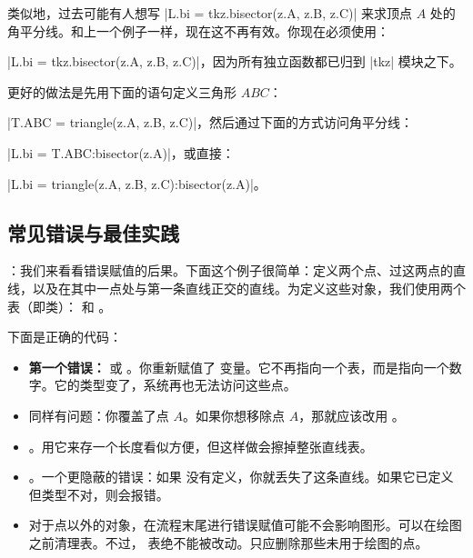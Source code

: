 \vspace{12pt}
类似地，过去可能有人想写 |L.bi = tkz.bisector(z.A, z.B, z.C)| 来求顶点 $A$ 处的角平分线。和上一个例子一样，现在这不再有效。你现在必须使用：

|L.bi = tkz.bisector(z.A, z.B, z.C)|，因为所有独立函数都已归到 |tkz| 模块之下。

更好的做法是先用下面的语句定义三角形 $ABC$：

|T.ABC = triangle(z.A, z.B, z.C)|，然后通过下面的方式访问角平分线：

|L.bi = T.ABC:bisector(z.A)|，或直接：

|L.bi = triangle(z.A, z.B, z.C):bisector(z.A)|。

\subsection{常见错误与最佳实践}

\vspace{1em}
\tkzRHand{\textcolor{red}{第二个警告}}：我们来看看错误赋值的后果。下面这个例子很简单：定义两个点、过这两点的直线，以及在其中一点处与第一条直线正交的直线。为定义这些对象，我们使用两个表（即类）： 和 。

下面是正确的代码：
\begin{mybox}{}
\begin{tkzexample}[latex=.5\textwidth]
\end{tkzexample}
\end{mybox}

\begin{itemize}
  \item \textbf{第一个错误：}  或 。你重新赋值了  变量。它不再指向一个表，而是指向一个数字。它的类型变了，系统再也无法访问这些点。
  \item {} 同样有问题：你覆盖了点 $A$。如果你想移除点 $A$，那就应该改用 。
  \item {}。用它来存一个长度看似方便，但这样做会擦掉整张直线表。
  \item {}。一个更隐蔽的错误：如果  没有定义，你就丢失了这条直线。如果它已定义但类型不对，则会报错。
  \item 对于点以外的对象，在流程末尾进行错误赋值可能不会影响图形。可以在绘图之前清理表。不过， 表绝不能被改动。只应删除那些未用于绘图的点。
\end{itemize}

